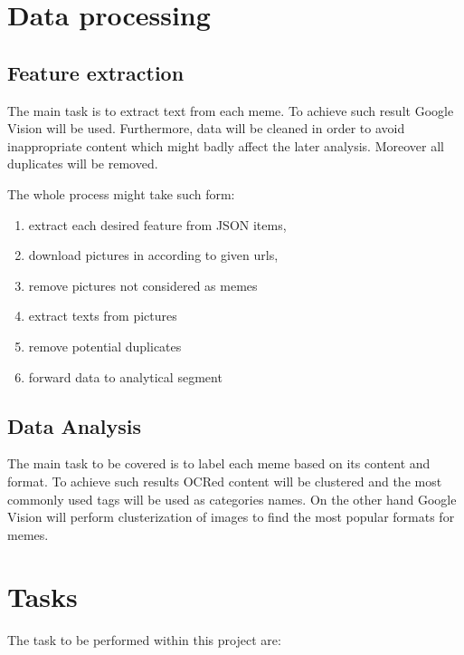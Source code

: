 \documentclass{article}
\begin{document}

\section{Data processing}
\subsection{Feature extraction}
The main task is to extract text from each meme. To achieve such result Google Vision will be used. Furthermore, data will be cleaned in order to avoid inappropriate content which might badly affect the later analysis. Moreover all duplicates will be removed. 

The whole process might take such form:
\begin{enumerate}
    \item extract each desired feature from JSON items,
    \item download pictures in according to given urls,
    \item remove pictures not considered as memes
    \item extract texts from pictures
    \item remove potential duplicates
    \item forward data to analytical segment
    
\end{enumerate}

\subsection{Data Analysis}
The main task to be covered is to label each meme based on its content and format. To achieve such results OCRed content will be clustered and the most commonly used tags will be used as categories names. On the other hand Google Vision will perform clusterization of images to find the most popular formats for memes.



\section{Tasks}
The task to be performed within this project are:
\end{document}
